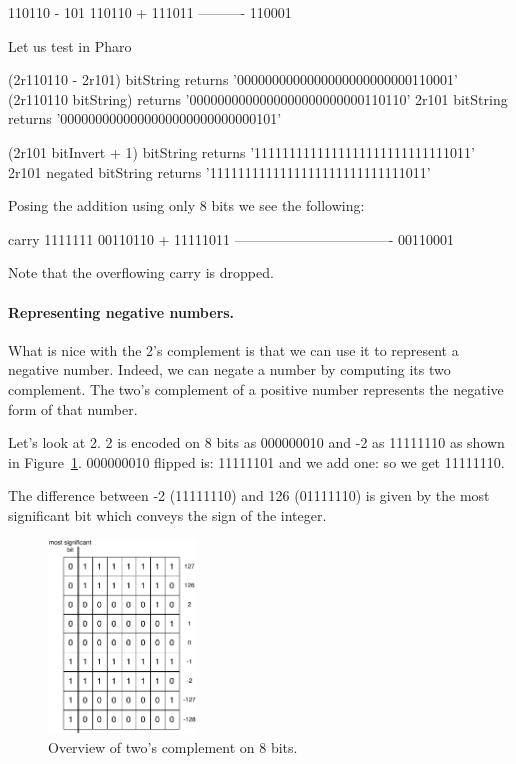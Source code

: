 \documentclass[a4paper,10pt,twoside]{book}
\begin{document}
\begin{code}{}
110110 - 101
   110110
+ 111011
----------
   110001
\end{code}

Let us test in Pharo
\begin{code}{}
(2r110110 - 2r101) bitString	
	returns '0000000000000000000000000110001'
(2r110110 bitString) 	
	returns '0000000000000000000000000110110'
2r101 bitString
	returns '0000000000000000000000000000101'		
							
(2r101 bitInvert + 1) bitString
	returns '1111111111111111111111111111011'	
2r101 negated bitString
	returns '1111111111111111111111111111011'	
\end{code}
	
Posing the addition using only 8 bits we see the following:

\begin{code}{}
carry	1111111 
		 00110110
+		11111011	
	----------------------------------
		 00110001	
\end{code}

Note that the overflowing carry is dropped.

\paragraph{Representing negative numbers.}
What is nice with the 2's complement is that we can use it to represent a negative number. Indeed, we can negate a number by computing its two complement. The two's complement of a positive number represents the negative form of that number.

Let's look at 2. 2 is encoded on 8 bits as 000000010 and -2 as 11111110 as shown in Figure~\ref{negativePositive}.
000000010 flipped is: 11111101 and we add one: so we get 11111110.



The difference between  -2 (11111110) and 126 (01111110) is given by the most significant bit which conveys the sign of the integer.

\begin{figure}[h]
\begin{center}
\includegraphics[width=0.35\textwidth]{8bits-Table}
\caption{Overview of two's complement on 8 bits.\label{negativePositive}}
\end{center}
\end{figure}
\end{document}
